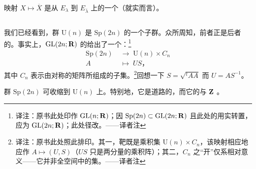 \begin{remark}\label{thm:sp-conjugate-isomorphism}
映射 $X\mapsto\overline{X}$ 是从 $E_\lambda$ 到 $E_{\overline{\lambda}}$ 上的一个\trIsomorphism（就实\trVectorSpace{}而言）。
\end{remark}

\subsection{\trPolarDecomposition}
\label{subsec:polar-decomposition}

我们已经看到，群 $\mathrm{U}(n)$ 是 $\mathrm{Sp}(2n)$ 的一个子群。众所周知，前者正是后者的\trMaximalCompactSubgroup。事实上，$\mathrm{GL}(2n;\mathbf{R})$ 的\trPolarDecomposition{}给出了一个\trHomeomorphism：\footnote{译注：原书此处印作 $\mathrm{GL}(n;\mathbf{R})$；因 $\mathrm{Sp}(2n)\subset\mathrm{GL}(2n;\mathbf{R})$ 且此处的\trPolarDecomposition{}用实转置，应为 $\mathrm{GL}(2n;\mathbf{R})$；此处径改。——译者注}
\[
\begin{aligned}
\mathrm{Sp}(2n)\;&\longrightarrow\;\mathrm{U}(n)\times C_n\\
A\;&\longmapsto\;US\text{，}
\end{aligned}
\]
其中 $C_n$ 表示由对称\trPositiveDefinite{}的\trSymplectic{}矩阵所组成的\trOpen{}子集。\footnote{译注：原书此处照此排印。其一，靶既是乘积集 $\mathrm{U}(n)\times C_n$，该映射相应地应作 $A\mapsto(U,S)$（$US$ 只是两分量的乘积阵）；其二，$C_n$ 之“开”仅系相对意义——它并非\trSymmetricMatrix{}全空间中的\trOpen{}集。——译者注}回想一下 $S=\sqrt{{}^tAA}$ 而 $U=AS^{-1}$。

\begin{proposition}\label{thm:sp-polar-retraction}
群 $\mathrm{Sp}(2n)$ 可收缩到 $\mathrm{U}(n)$ 上。特别地，它是道路\trConnected{}的，而它的\trFundamentalGroup{}与 $\mathbf{Z}$ \trIsomorphic。
\end{proposition}

